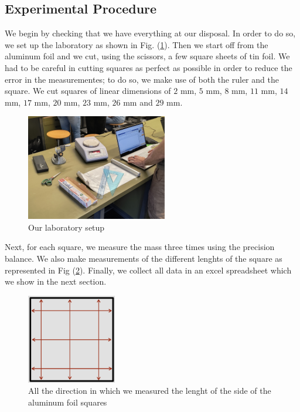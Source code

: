 \documentclass[a4paper,12pt]{article}
\begin{document}
\subsection{Experimental Procedure}
We begin by checking that we have everything at our disposal. In order to do so, we set up the laboratory as shown in Fig. (\ref{fig:lab_instr}).
Then we start off from the aluminum foil and we cut, using the scissors, a few square sheets of tin foil. 
We had to be careful in cutting squares as perfect as possible in order to reduce the error in 
the measurementes; to do so, we make use of both the ruler and the square. We cut squares of linear 
dimensions of $2$ mm, $5$ mm, $8$ mm, $11$ mm, $14$ mm, $17$ mm, $20$ mm, $23$ mm, $26$ mm and $29$ mm.

\begin{figure}[h]
    \centering
    \includegraphics[width = 0.55\textwidth]{Lab_instruments.jpg}
    \caption{Our laboratory setup}
    \label{fig:lab_instr}
\end{figure}

Next, for each square, we measure the mass three times using the precision balance. We also make measurements of the different 
lenghts of the square as represented in Fig (\ref{fig:sq_measure}). Finally, we collect all data in an excel spreadsheet which we show in the next section.
\begin{figure}[h]
    \centering
    \includegraphics[width = 0.35\textwidth]{square_measure.png}
    \caption{All the direction in which we measured the lenght of the side of the aluminum foil squares} 
    \label{fig:sq_measure}
\end{figure}
\end{document}
